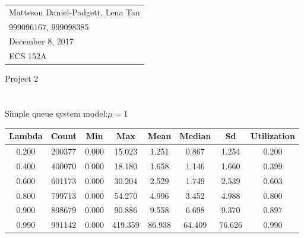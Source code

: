 \documentclass{article}
\begin{document}
	\null\hfill\begin{tabular}[t]{l@{}}
	Matteson Daniel-Padgett, Lena Tan\\
	999096167, 999098385\\
	December 8, 2017\\
	ECS 152A
\end{tabular}
	
\begin{center}	
\sc \Large Project 2
\end{center}	

\part{}	
	
\section{}
Simple queue system model:$\mu = 1$ \\
\begin{center}
\begin{tabular}{c | c | c | c | c | c | c | c}
	Lambda & Count & Min & Max & Mean & Median & Sd & Utilization \\
	\hline
	0.200 & 200377 & 0.000 & 15.023 & 1.251 & 0.867 & 1.254 & 0.200 \\ 
	0.400 & 400070 & 0.000 & 18.180 & 1.658 & 1.146 & 1.660 & 0.399 \\ 
	0.600 & 601173 & 0.000 & 30.204 & 2.529 & 1.749 & 2.539 & 0.603 \\ 
	0.800 & 799713 & 0.000 & 54.270 & 4.996 & 3.452 & 4.988 & 0.800 \\ 
	0.900 & 898679 & 0.000 & 90.886 & 9.558 & 6.698 & 9.370 & 0.897 \\
	0.990 & 991142 & 0.000 & 419.359 & 86.938 & 64.409 & 76.626 & 0.990 \\
\end{tabular} \\
\end{center}
\end{document}
